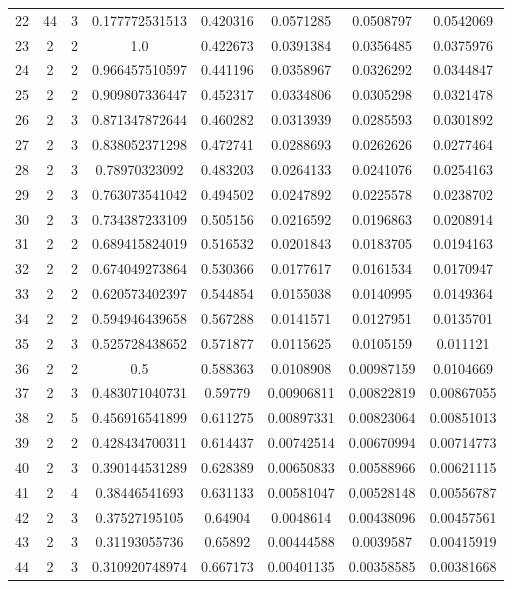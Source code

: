 \begin{longtable}{|c|c|c|c|c|c|c|c|}
22 & 44 & 3 & 0.177772531513 & 0.420316 & 0.0571285 & 0.0508797 & 0.0542069 \\
23 & 2 & 2 & 1.0 & 0.422673 & 0.0391384 & 0.0356485 & 0.0375976 \\
24 & 2 & 2 & 0.966457510597 & 0.441196 & 0.0358967 & 0.0326292 & 0.0344847 \\
25 & 2 & 2 & 0.909807336447 & 0.452317 & 0.0334806 & 0.0305298 & 0.0321478 \\
26 & 2 & 3 & 0.871347872644 & 0.460282 & 0.0313939 & 0.0285593 & 0.0301892 \\
27 & 2 & 3 & 0.838052371298 & 0.472741 & 0.0288693 & 0.0262626 & 0.0277464 \\
28 & 2 & 3 & 0.78970323092 & 0.483203 & 0.0264133 & 0.0241076 & 0.0254163 \\
29 & 2 & 3 & 0.763073541042 & 0.494502 & 0.0247892 & 0.0225578 & 0.0238702 \\
30 & 2 & 3 & 0.734387233109 & 0.505156 & 0.0216592 & 0.0196863 & 0.0208914 \\
31 & 2 & 2 & 0.689415824019 & 0.516532 & 0.0201843 & 0.0183705 & 0.0194163 \\
32 & 2 & 2 & 0.674049273864 & 0.530366 & 0.0177617 & 0.0161534 & 0.0170947 \\
33 & 2 & 2 & 0.620573402397 & 0.544854 & 0.0155038 & 0.0140995 & 0.0149364 \\
34 & 2 & 2 & 0.594946439658 & 0.567288 & 0.0141571 & 0.0127951 & 0.0135701 \\
35 & 2 & 3 & 0.525728438652 & 0.571877 & 0.0115625 & 0.0105159 & 0.011121 \\
36 & 2 & 2 & 0.5 & 0.588363 & 0.0108908 & 0.00987159 & 0.0104669 \\
37 & 2 & 3 & 0.483071040731 & 0.59779 & 0.00906811 & 0.00822819 & 0.00867055 \\
38 & 2 & 5 & 0.456916541899 & 0.611275 & 0.00897331 & 0.00823064 & 0.00851013 \\
39 & 2 & 2 & 0.428434700311 & 0.614437 & 0.00742514 & 0.00670994 & 0.00714773 \\
40 & 2 & 3 & 0.390144531289 & 0.628389 & 0.00650833 & 0.00588966 & 0.00621115 \\
41 & 2 & 4 & 0.38446541693 & 0.631133 & 0.00581047 & 0.00528148 & 0.00556787 \\
42 & 2 & 3 & 0.37527195105 & 0.64904 & 0.0048614 & 0.00438096 & 0.00457561 \\
43 & 2 & 3 & 0.31193055736 & 0.65892 & 0.00444588 & 0.0039587 & 0.00415919 \\
44 & 2 & 3 & 0.310920748974 & 0.667173 & 0.00401135 & 0.00358585 & 0.00381668 \\

\end{longtable}
